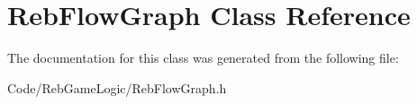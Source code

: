 \hypertarget{class_reb_flow_graph}{}\section{Reb\+Flow\+Graph Class Reference}
\label{class_reb_flow_graph}


The documentation for this class was generated from the following file\+:\begin{DoxyCompactItemize}
\item 
Code/\+Reb\+Game\+Logic/Reb\+Flow\+Graph.\+h\end{DoxyCompactItemize}
